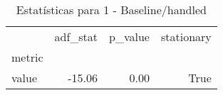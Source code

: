 \begin{table}[htbp]
\caption{Estatísticas para 1 - Baseline/handled}
\label{tab:1_-_baseline_handled_adf_test}
\begin{tabular}{lrrr}
\toprule
 & adf_stat & p_value & stationary \\
metric &  &  &  \\
\midrule
value & -15.06 & 0.00 & True \\
\bottomrule
\end{tabular}
\end{table}
